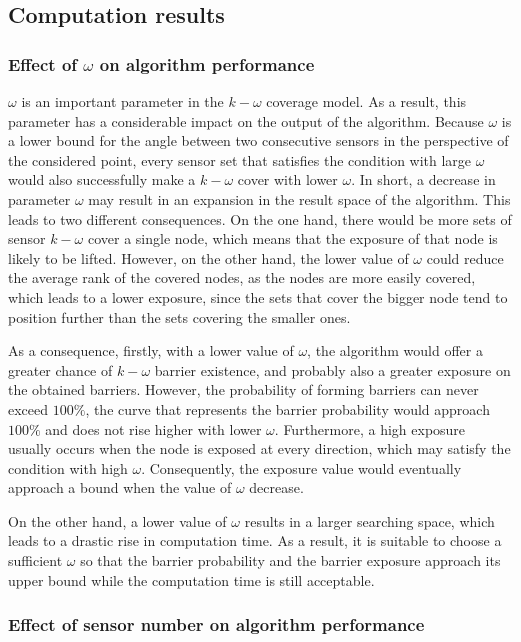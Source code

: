 \subsection{Computation results}

\subsubsection{Effect of $\omega$ on algorithm performance}

$\omega$ is an important parameter in the $k-\omega$ coverage model. As a result, this parameter has a considerable impact on the output of the algorithm. Because $\omega$ is a lower bound for the angle between two consecutive sensors in the perspective of the considered point, every sensor set that satisfies the condition with large $\omega$ would also successfully make a $k-\omega$ cover with lower $\omega$. In short, a decrease in parameter $\omega$ may result in an expansion in the result space of the algorithm. This leads to two different consequences. On the one hand, there would be more sets of sensor $k-\omega$ cover a single node, which means that the exposure of that node is likely to be lifted. However, on the other hand, the lower value of $\omega$ could reduce the average rank of the covered nodes, as the nodes are more easily covered, which leads to a lower exposure, since the sets that cover the bigger node tend to position further than the sets covering the smaller ones.

As a consequence, firstly, with a lower value of $\omega$, the algorithm would offer a greater chance of $k-\omega$ barrier existence, and probably also a greater exposure on the obtained barriers. However, the probability of forming barriers can never exceed $100\%$, the curve that represents the barrier probability would approach $100\%$ and does not rise higher with lower $\omega$. Furthermore, a high exposure usually occurs when the node is exposed at every direction, which may satisfy the condition with high $\omega$. Consequently, the exposure value would eventually approach a bound when the value of $\omega$ decrease.

On the other hand, a lower value of $\omega$ results in a larger searching space, which leads to a drastic rise in computation time. As a result, it is suitable to choose a sufficient $\omega$ so that the barrier probability and the barrier exposure approach its upper bound while the computation time is still acceptable.

\subsubsection{Effect of sensor number on algorithm performance}

